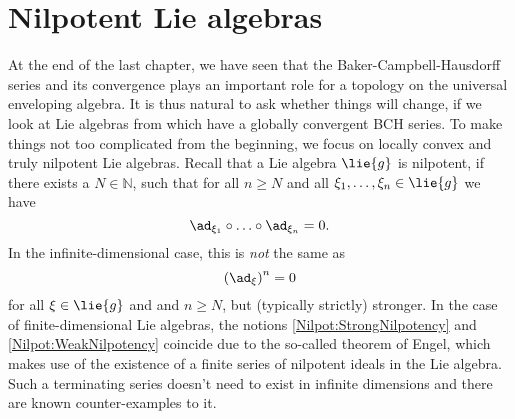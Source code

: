 
%
%

\chapter{Nilpotent Lie algebras}

At the end of the last chapter, we have seen that the Baker-Campbell-Hausdorff 
series and its convergence plays an important role for a topology on the 
universal enveloping algebra. It is thus natural to ask whether things will 
change, if we look at Lie algebras from which have a globally convergent BCH 
series. To make things not too complicated from the beginning, we focus on 
locally convex and truly nilpotent Lie algebras. Recall that a Lie algebra 
$\lie{g}$ is nilpotent, if there exists a $N \in \mathbb{N}$, such that for 
all $n \geq N$ and all $\xi_1, \ldots, \xi_n \in \lie{g}$ we have
\begin{equation}
	\label{Nilpot:StrongNilpotency}
	\ad_{\xi_1} \circ \ldots \circ \ad_{\xi_n}
	=
	0.
\end{equation}
In the infinite-dimensional case, this is \emph{not} the same as 
\begin{equation*}
	\label{Nilpot:WeakNilpotency}
	\left( \ad_{\xi} \right)^n
	=
	0
\end{equation*}
for all $\xi \in \lie{g}$ and and $n \geq N$, but (typically strictly) 
stronger. In the case of finite-dimensional Lie algebras, the notions 
\eqref{Nilpot:StrongNilpotency} and \eqref{Nilpot:WeakNilpotency} coincide due 
to the so-called theorem of Engel, which makes use of the existence of a 
finite series of nilpotent ideals in the Lie algebra. Such a terminating 
series doesn't need to exist in infinite dimensions and there are known 
counter-examples to it.

